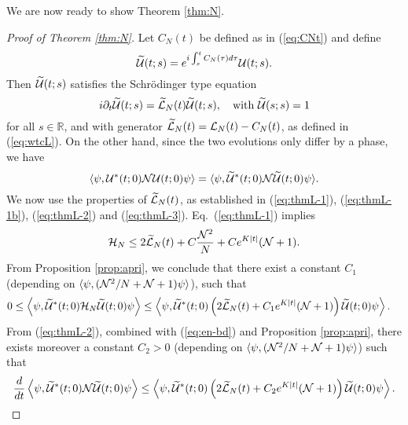 \documentclass[11pt,a4paper]{article}
\newcommand{\ech}[2]{#2}	%
\newcommand{\cU}{{\cal U}}
\newcommand{\bR}{{\mathbb R}}
\newcommand{\wt}{\widetilde}
\newcommand{\cH}{{\cal H}}
\newcommand{\cL}{{\cal L}}
\newcommand{\cN}{{\cal N}}
\begin{document}
We are now ready to show Theorem \ref{thm:N}.

\begin{proof}[Proof of Theorem \ref{thm:N}]
Let $C_N (t)$ be defined as in (\ref{eq:CNt}) and define
\[ \wt{\cU} (t;s) = e^{i \int_s^t C_N (\tau) d\tau} \cU (t;s). \]
Then $\wt{\cU} (t;s)$ satisfies the Schr\"odinger type equation
\[ i\partial_t \wt{\cU} (t;s) = \wt{\cL}_N (t) \wt{\cU} (t;s), \quad \text{with } \wt{\cU} (s;s) = 1 \]
for all $s \in \bR$, and with generator $\wt{\cL}_N (t) = \cL_N (t) - C_N (t)$, as defined in (\ref{eq:wtcL}). On the other hand, since the two evolutions only differ by a phase, we have
\[ \langle \psi , \cU^* (t;0) \cN \cU (t;0) \psi \rangle = \langle \psi , \wt{\cU}^* (t;0) \cN \wt{\cU} (t;0) \psi \rangle. \]
We now use the properties of $\wt{\cL}_N(t)$, as established in (\ref{eq:thmL-1}), (\ref{eq:thmL-1b}), (\ref{eq:thmL-2}) and (\ref{eq:thmL-3}).\ech{To this end, we observe that, by the assumption $\varphi \in H^4 (\bR^3)$ and by Proposition \ref{t:pdes}, there exist constants $C,K > 0$ such that \begin{equation}\label{eq:varphi-bds}  \| \varphi_t^{(N)} \|_{H^4}^2 , \left(\| \varphi_t^{(N)} \|_{H^4} \| \varphi_t^{(N)} \|_{H^2} + \| \varphi_t^{(N)} \|_{H^2}^3 \right) \leq C e^{K |t|} \end{equation}
uniformly in $N$, and for all $t \in \bR$.}{} Eq.\ (\ref{eq:thmL-1}) implies \ech{therefore}{} 
\begin{equation}\label{eq:en-bd} \cH_N \leq 2 \wt{\cL}_N (t) + C \frac{\cN^2}{N} + C e^{K |t|} (\cN + 1). \end{equation}
{F}rom Proposition \ref{prop:apri}, we conclude that there exist a constant $C_1$ (depending on $\langle \psi , (\cN^2/ N + \cN + 1) \psi \rangle$\ech{and on the constant $C$ in (\ref{eq:varphi-bds})}{}), such that
\begin{equation}\label{eq:grw-1} \begin{split} 
0 \leq \Big\langle \psi , \wt{\cU}^* (t;0) &\cH_N \wt{\cU} (t;0) \psi \Big\rangle \leq \left\langle \psi , \wt{\cU}^* (t;0) \left( 2 \wt{\cL}_N (t) + C_1 e^{K|t|} (\cN + 1) \right) \wt{\cU} (t;0) \psi \right\rangle. \end{split} \end{equation}
{F}rom (\ref{eq:thmL-2}), combined with (\ref{eq:en-bd}) and Proposition \ref{prop:apri}, there exists moreover a constant $C_2 > 0$ (depending on $\langle \psi , (\cN^2/ N + \cN + 1) \psi \rangle$\ech{ and on the constant $C$ in (\ref{eq:varphi-bds})}{}) such that
\[  
\frac{d}{dt} \left\langle \psi, \wt{\cU}^* (t;0) \cN \wt{\cU} (t;0) \psi \right\rangle  \leq  \left\langle \psi , \wt{\cU}^* (t;0)  \left(2 \wt{\cL}_N (t) +C_2 e^{K|t|} (\cN + 1) \right)  \wt{\cU} (t;0) \psi \right\rangle.
\]
\end{proof}
\end{document}
